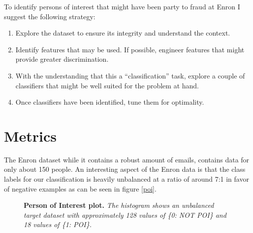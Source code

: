 \documentclass[titlepage,numbers=noenddot,headinclude,%
               footinclude=true,abstractoff,BCOR=5mm,%
               paper=a4,fontsize=11pt,ngerman,american]{scrreprt}
\numberwithin{theorem}{chapter}
\numberwithin{definition}{chapter}
\numberwithin{algorithm}{chapter}
\numberwithin{figure}{chapter}
\numberwithin{table}{chapter}
\numberwithin{equation}{chapter}
\begin{document}
To identify persons of interest that might have been party to fraud at Enron I suggest the following strategy:
\begin{enumerate}%
\item Explore the dataset to ensure its integrity and understand the context.
\item Identify features that may be used. If possible, engineer features that might provide greater discrimination.
\item With the understanding that this a ``classification'' task, explore a couple of classifiers that might be well suited for the problem at hand.
\item Once classifiers have been identified, tune them for optimality.
\end{enumerate}



\section*{Metrics}

The Enron dataset while it contains a robust amount of emails, contains data for only about 150 people. An interesting aspect of the Enron data is that the class labels for our classification is heavily unbalanced at a ratio of around 7:1 in favor of negative examples as can be seen in figure \ref{poi}.

\begin{figure}[!hbtp]
\centering

    \caption{\textbf{Person of Interest plot. }\textit{The histogram shows an unbalanced target dataset with approximately 128 values of \{0: NOT POI\} and 18 values of \{1: POI\}.}}
\end{figure}
\end{document}
